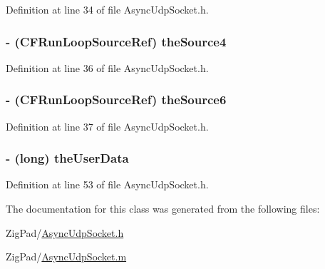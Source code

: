 Definition at line 34 of file AsyncUdpSocket.h.

\hypertarget{interface_async_udp_socket_a11ed80b25840f9c2e1fb11fb81516e9f}{
\subsubsection[{theSource4}]{\setlength{\rightskip}{0pt plus 5cm}-\/ (CFRunLoopSourceRef) {\bf theSource4}}}
\label{interface_async_udp_socket_a11ed80b25840f9c2e1fb11fb81516e9f}


Definition at line 36 of file AsyncUdpSocket.h.

\hypertarget{interface_async_udp_socket_afa4beb0b77a9fc1de8e37e665ef8ab99}{
\subsubsection[{theSource6}]{\setlength{\rightskip}{0pt plus 5cm}-\/ (CFRunLoopSourceRef) {\bf theSource6}}}
\label{interface_async_udp_socket_afa4beb0b77a9fc1de8e37e665ef8ab99}


Definition at line 37 of file AsyncUdpSocket.h.

\hypertarget{interface_async_udp_socket_af6dc350be3ed36a9ea2bd10580c263d2}{
\subsubsection[{theUserData}]{\setlength{\rightskip}{0pt plus 5cm}-\/ (long) {\bf theUserData}}}
\label{interface_async_udp_socket_af6dc350be3ed36a9ea2bd10580c263d2}


Definition at line 53 of file AsyncUdpSocket.h.



The documentation for this class was generated from the following files:\begin{DoxyCompactItemize}
\item 
ZigPad/\hyperlink{_async_udp_socket_8h}{AsyncUdpSocket.h}\item 
ZigPad/\hyperlink{_async_udp_socket_8m}{AsyncUdpSocket.m}\end{DoxyCompactItemize}
